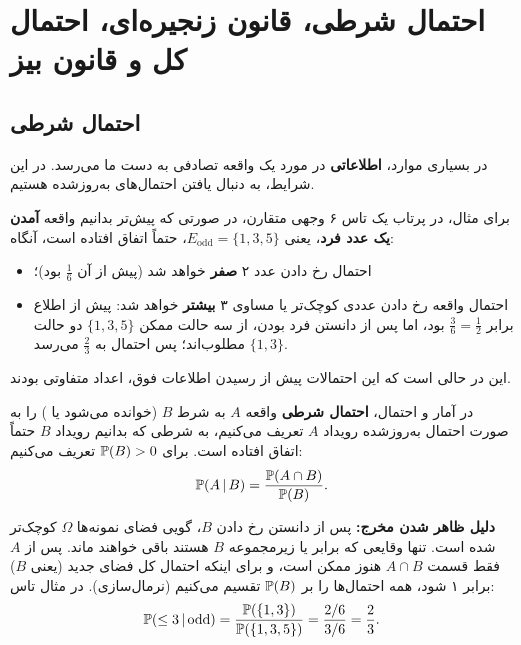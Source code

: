 \chapter{احتمال شرطی، قانون زنجیره‌ای، احتمال کل و قانون بیز}

\section{احتمال شرطی }

در بسیاری موارد، \textbf{اطلاعاتی} در مورد یک واقعه تصادفی به دست ما می‌رسد. در این شرایط، به دنبال یافتن احتمال‌های به‌روزشده هستیم.

برای مثال، در پرتاب یک تاس ۶ وجهی متقارن، در صورتی که پیش‌تر بدانیم واقعه \textbf{آمدن یک عدد فرد}، یعنی $E_{\text{odd}}=\{1,3,5\}$، حتماً اتفاق افتاده است، آنگاه:
\begin{itemize}
\item احتمال رخ دادن عدد ۲ \textbf{صفر} خواهد شد (پیش از آن $\frac16$ بود)؛
\item احتمال واقعه رخ دادن عددی کوچک‌تر یا مساوی ۳ \textbf{بیشتر} خواهد شد: پیش از اطلاع برابر $\frac36=\frac12$ بود، اما پس از دانستن فرد بودن، از سه حالت ممکن $\{1,3,5\}$ دو حالت $\{1,3\}$ مطلوب‌اند؛ پس احتمال به $\frac23$ می‌رسد.
\end{itemize}
این در حالی است که این احتمالات پیش از رسیدن اطلاعات فوق، اعداد متفاوتی بودند.

\begin{definition}
در آمار و احتمال، \textbf{احتمال شرطی} واقعه $A$ به شرط $B$ (خوانده می‌شود  یا ) را به صورت احتمال به‌روزشده رویداد $A$ تعریف می‌کنیم، به شرطی که بدانیم رویداد $B$ حتماً اتفاق افتاده است. برای $\mathbb{P}(B)>0$ تعریف می‌کنیم:
\[
\mathbb{P}(A\,|\, B)=\frac{\mathbb{P}(A\cap B)}{\mathbb{P}(B)} .
\]
\end{definition}

\textbf{دلیل ظاهر شدن مخرج:} پس از دانستن رخ دادن $B$، گویی فضای نمونه‌ها $\Omega$ کوچک‌تر شده است. تنها وقایعی که برابر یا زیرمجموعه $B$ هستند باقی خواهند ماند. پس از $A$ فقط قسمت $A\cap B$ هنوز ممکن است، و برای اینکه احتمال کل فضای جدید (یعنی $B$) برابر ۱ شود، همه احتمال‌ها را بر $\mathbb{P}(B)$ تقسیم می‌کنیم (نرمال‌سازی). در مثال تاس:
\[
\mathbb{P}(\le3\,|\, \text{odd})=\frac{\mathbb{P}(\{1,3\})}{\mathbb{P}(\{1,3,5\})}=\frac{2/6}{3/6}=\frac23 .
\]

